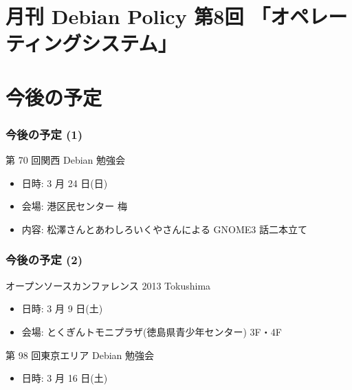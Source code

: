 \documentclass[cjk,dvipdfmx,10pt,compress,%
hyperref={bookmarks=true,bookmarksnumbered=true,bookmarksopen=false,%
colorlinks=false,%
pdftitle={第 69 回 関西 Debian 勉強会},%
pdfauthor={倉敷・のがた・佐々木・かわだ},%
pdfsubject={資料},%
}]{beamer}
\begin{document}

\section{月刊 Debian Policy 第8回 「オペレーティングシステム」}


\section{今後の予定}
\begin{frame}[fragile]
\frametitle{今後の予定 (1)}

\begin{block}{第 70 回関西 Debian 勉強会}
  \begin{itemize}
  \item 日時: 3 月 24 日(日)
  \item 会場: 港区民センター 梅
  \item 内容: 松澤さんとあわしろいくやさんによる GNOME3 話二本立て
  \end{itemize}
\end{block}

\end{frame}

\begin{frame}[fragile]
\frametitle{今後の予定 (2)}

\begin{block}{オープンソースカンファレンス 2013 Tokushima}
  \begin{itemize}
  \item 日時: 3 月 9 日(土)
  \item 会場: とくぎんトモニプラザ(徳島県青少年センター) 3F・4F
  \end{itemize}
\end{block}

\begin{block}{第 98 回東京エリア Debian 勉強会}
  \begin{itemize}
  \item 日時: 3 月 16 日(土)
  \end{itemize}
\end{block}

\end{frame}


\takahashi[50]{  }
\end{document}
